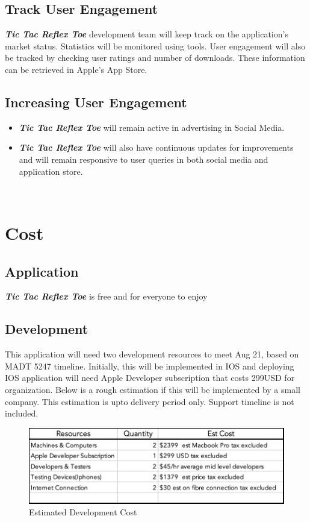 \documentclass{article}
\begin{document}
\subsection{Track User Engagement}
    \textbf{\emph{Tic Tac Reflex Toe}} development team will keep track on the application's market status.  Statistics will be monitored using tools.  User engagement will also be tracked by 
    checking user ratings and number of downloads.  These information can be retrieved in Apple’s App Store.  
    ~\newline
\subsection{Increasing User Engagement}
    \begin{itemize}
        \item \textbf{\emph{Tic Tac Reflex Toe}} will remain active in advertising in Social Media.
        \item \textbf{\emph{Tic Tac Reflex Toe}} will also have continuous updates for improvements and will remain responsive to user queries in both social media and application store.
    \end{itemize}
    
~\newline
\section{Cost}
    \subsection{Application}
        \textbf{\emph{Tic Tac Reflex Toe}} is free and for everyone to enjoy
    \subsection{Development} 
        This application will need two development resources to meet Aug 21, based on MADT 5247 timeline.  Initially, this will be implemented in IOS and deploying IOS application will need Apple Developer subscription that costs 299USD for organization.  Below is a rough estimation if this will be implemented by a small company. This estimation is upto delivery period only.  Support timeline is not included.
        \begin{figure}[h]
        \centering
        \includegraphics[width=5in]{images/Cost.jpg}
        \caption{Estimated Development Cost}
        \end{figure}
~\newline
\end{document}
